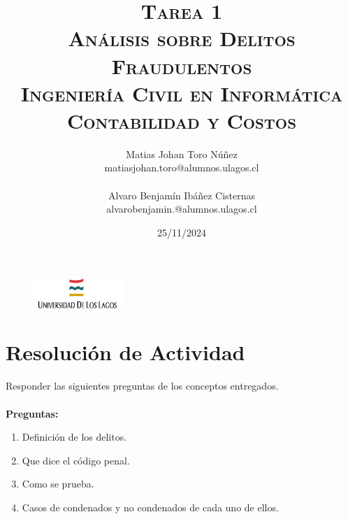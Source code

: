 \documentclass[letter,12pt]{article}
\begin{document}
	\begin{figure}
		\includegraphics[width=0.3\textwidth, left]{figures/download.png}
	\end{figure}
	\setlength{\unitlength}{1 cm} 
	\title{\scshape\Huge{Tarea 1}\\\vspace{0.5cm}
		\Large \textbf{Análisis sobre Delitos Fraudulentos}\\\vspace{2cm}
		\Large Ingeniería Civil en Informática\\\vspace{1cm}
		\Large Contabilidad y Costos\\\vspace{2cm}}
	
	\author{
		Matias Johan Toro Núñez\\
		matiasjohan.toro@alumnos.ulagos.cl\\\\
		Alvaro Benjamín Ibáñez Cisternas\\
		alvarobenjamin.@alumnos.ulagos.cl
	\vspace{3cm}}
	
	\date{25/11/2024}
	\maketitle
	\thispagestyle{empty}
	\clearpage
	\setcounter{page}{1}
	
	\tableofcontents
	\newpage
	
	
	\section{Resolución de Actividad}
	Responder las siguientes preguntas de los conceptos entregados.\\\\
	\textbf{Preguntas:}
	\begin{enumerate}
		\item Definición de los delitos.\\
		\item Que dice el código penal.\\
		\item Como se prueba.\\
		\item Casos de condenados y no condenados de cada uno de ellos.\\\\
	\end{enumerate}
	
\end{document}
